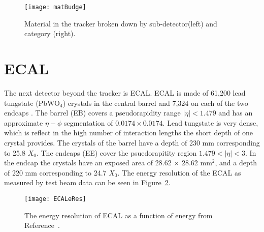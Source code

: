     \begin{figure}[!Hhbt]
      \centering
      \texttt{[image: matBudge]}
      \caption{Material in the tracker broken down by sub-detector(left) and
        category (right).}
      \label{fig:matBudge}
    \end{figure}

  \section{ECAL}
    The next detector beyond the tracker is ECAL.
    ECAL is made of 61,200 lead tungstate (PbWO$_{4}$) crystals in the central
    	barrel and 7,324 on each of the two endcaps \cite{tCmsE}.
    The barrel (EB) covers a pseudorapidity range $|\eta| < 1.479$ and has an
    	approximate $\eta-\phi$ segmentation of $0.0174\times0.0174$.
    Lead tungstate is very dense, which is reflect in the high number of interaction
    	lengths the short depth of one crystal provides.
    The crystals of the barrel have a depth of 230 mm corresponding to 25.8 
    	$X_{0}$.
    The endcaps (EE) cover the psuedorapitity region $1.479 < |\eta| < 3$.
    In the endcap the crystals have an exposed area of 28.62 $\times$ 28.62 
    	mm$^{2}$, and a depth of 220 mm corresponding to 24.7 $X_{0}$.
    The energy resolution of the ECAL as measured by test beam data can be seen in
    	Figure~\ref{ECALeRes}.
    \begin{figure}[h]
      \centering
        \texttt{[image: ECALeRes]}
      \caption{The energy resolution of ECAL as a function of energy from 
    	Reference~\cite{tCmsE}.}
      \label{ECALeRes}
    \end{figure}

